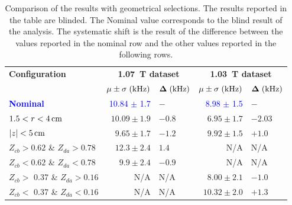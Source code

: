 \begin{table}[!h]
\centering							
\begin{tabular}{l||r|l||r|l}					
\hline
\hline								
\textbf{Configuration} & \multicolumn{2}{c||}{\textbf{\SI{1.07}{\tesla} dataset}} & \multicolumn{2}{c}{\textbf{\SI{1.03}{\tesla} dataset}} \\
 & $	\mu	\pm	\sigma \;({\rm kHz})$ & $	\bf{\Delta}	\;({\rm kHz})$ & $	\mu	\pm	\sigma	\;({\rm kHz}) $ & $	\bf{\Delta}	\;({\rm kHz})$ \\
\hline
\hline
{\bf \textcolor{blue}{Nominal}}	& {\textcolor{blue}{10.84 $\pm$ 1.7}} &$- $& {\textcolor{blue}{8.98 $\pm$ 1.5 }}& $ - $ \\
\hline
\hline
$1.5< r< 4\,{\rm cm}$ & $ 10.09 \pm 1.9 $ & $ -0.8 $& $ 6.95 \pm 1.7 $ & $ -2.03  $ \\
$ |z|<5\,{\rm cm}$    & $9.65 \pm 1.7$ & $-1.2 $& $9.92 \pm 1.5$ & $ +1.0 $ \\
\hline
\hline
 $Z_{cb} > 0.62 $ \& $Z_{da} > 0.78$ & $ 12.3 \pm 2.4 $ & $ 1.4$ & N/A & N/A\\
 $Z_{cb} < 0.62 $ \& $Z_{da} < 0.78$ & $ 9.9 \pm 2.4  $ & $-0.9$ & N/A & N/A\\
\hline
 $Z_{cb} >$ 0.37  \& $Z_{da} > 0.16$ & N/A & N/A & $8.00  \pm 2.1$ & $ -1.0 $ \\
 $Z_{cb} <$ 0.37  \& $Z_{da} < 0.16$ & N/A & N/A & $10.32 \pm 2.0$ & $ +1.3$\\

\hline
\hline
\end{tabular}
\caption{Comparison of the results with geometrical selections. The results reported in the table are blinded. The Nominal value corresponds to the blind result of the analysis. The systematic shift is the result of the difference between the values reported in the nominal row and the other values reported in the following rows.}
\label{tab:selections}
\end{table}

